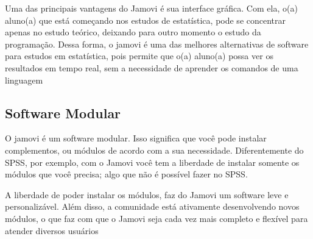 Uma das principais vantagens do Jamovi é sua interface gráfica. Com ela, o(a) aluno(a) que está começando nos estudos de estatística, pode se concentrar apenas no estudo teórico, deixando para outro momento o estudo da programação. Dessa forma, o jamovi é uma das melhores alternativas de software para estudos em estatística, pois permite que o(a) aluno(a) possa ver os resultados em tempo real, sem a necessidade de aprender os comandos de uma linguagem

\subsection{Software Modular}

O jamovi é um software modular. Isso significa que você pode instalar complementos, ou módulos de acordo com a sua necessidade. Diferentemente do SPSS, por exemplo, com o Jamovi você tem a liberdade de instalar somente os módulos que você precisa; algo que não é possível fazer no SPSS.

A liberdade de poder instalar os módulos, faz do Jamovi um software leve e personalizável. Além disso, a comunidade está ativamente desenvolvendo novos módulos, o que faz com que o Jamovi seja cada vez mais completo e flexível para atender diversos usuários

